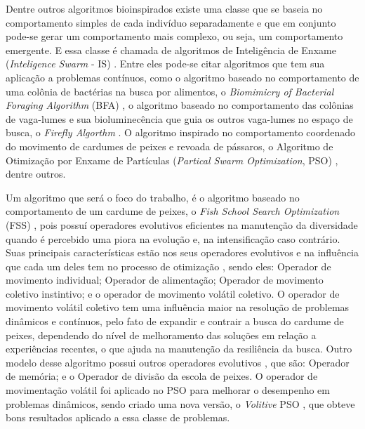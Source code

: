 Dentre outros algoritmos bioinspirados existe uma classe que se baseia no comportamento simples de cada indivíduo separadamente e que em conjunto pode-se gerar um comportamento mais complexo, ou seja, um comportamento emergente. E essa classe é chamada de algoritmos de Inteligência de Enxame (\textit{Inteligence Swarm} - IS) \cite{parpinelli2011new}. Entre eles pode-se citar algoritmos que tem sua aplicação a problemas contínuos, como o algoritmo baseado no comportamento de uma colônia de bactérias na busca por alimentos, o \textit{Biomimicry of Bacterial Foraging Algorithm} (BFA) \cite{passino2002biomimicry}, o algoritmo baseado no comportamento das colônias de vaga-lumes e sua bioluminecência que guia os outros vaga-lumes no espaço de busca, o \textit{Firefly Algorthm} \cite{firefly}. O algoritmo inspirado no comportamento coordenado do movimento de cardumes de peixes e revoada de pássaros, o Algoritmo de Otimização por Enxame de Partículas (\textit{Partical Swarm Optimization}, PSO) \cite{pso}, dentre outros.

Um algoritmo que será o foco do trabalho, é o algoritmo baseado no comportamento de um cardume de peixes, o \textit{Fish School Search Optimization} (FSS) \cite{carmelo2008novel}, pois possuí operadores evolutivos eficientes na manutenção da diversidade quando é percebido uma piora na evolução e, na intensificação caso contrário. Suas principais características estão nos seus operadores evolutivos e na influência que cada um deles tem no processo de otimização \cite{c2009influence}, sendo eles: Operador de movimento individual; Operador de alimentação; Operador de movimento coletivo instintivo; e o operador de movimento volátil coletivo. O operador de movimento volátil coletivo tem uma influência maior na resolução de problemas dinâmicos e contínuos, pelo fato de expandir e contrair a busca do cardume de peixes, dependendo do nível de melhoramento das soluções em relação a experiências recentes, o que ajuda na manutenção da resiliência da busca. Outro modelo desse algoritmo possui outros operadores evolutivos \cite{madeiro2011density}, que são: Operador de memória; e o Operador de divisão da escola de peixes. O operador de movimentação volátil foi aplicado no PSO para melhorar o desempenho em problemas dinâmicos, sendo criado uma nova versão, o \textit{Volitive} PSO \cite{cavalcanti2011hybrid}, que obteve bons resultados aplicado a essa classe de problemas.

